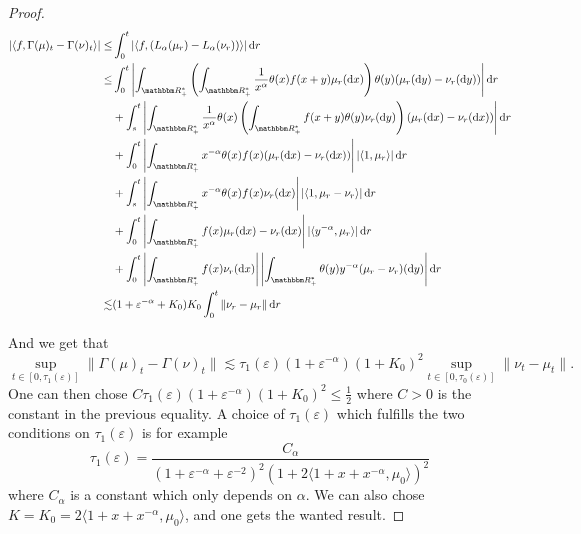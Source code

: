 \documentclass[a4paper,11pt, reqno]{amsart}
\newcommand{\eps}{\varepsilon}
\newcommand{\dd}{\mathop{}\!\mathrm{d}}
\newcommand{\1}{\mathbbm{1}}
\theoremstyle{plain}
\theoremstyle{definition}
\begin{document}
\begin{proof}
  \begin{align*}
    | \langle f, \Gamma (\mu)_t - \Gamma (\nu)_t \rangle | \le &
    \int_0^t | \langle f, (L_{\alpha} (\mu_r) - L_{\alpha} (\nu_r)) \rangle |
    \dd r\\
    \le & \int_0^t \left| \int_{\RR^{\ast}_+} \left(
    \int_{\RR^{\ast}_+} \frac{1}{x^{\alpha}} \theta (x) f (x + y) \mu_r
    (\dd x) \right) \theta (y) (\mu_r (\dd y) - \nu_r (\dd y))
    \right| \dd r\\
    & + \int_s^t \left| \int_{\RR^{\ast}_+} \frac{1}{x^{\alpha}}
    \theta (x) \left( \int_{\RR^{\ast}_+} f (x + y) \theta (y) \nu_r
    (\dd y) \right) (\mu_r (\dd x) - \nu_r (\dd x)) \right| \dd
    r\\
    & + \int_0^t \left| \int_{\RR^{\ast}_+} x^{- \alpha} \theta (x) f
    (x) (\mu_r (\dd x) - \nu_r (\dd x)) \right| | \langle 1, \mu_r
    \rangle | \dd r\\
    & + \int_s^t \left| \int_{\RR^{\ast}_+} x^{- \alpha} \theta (x) f
    (x) \nu_r (\dd x) \right| | \langle 1, \mu_r - \nu_r \rangle | \dd
    r\\
    & + \int_0^t \left| \int_{\RR^{\ast}_+} f (x) \mu_r (\dd x) -
    \nu_r (\dd x) \right| | \langle y^{- \alpha}, \mu_r \rangle | \dd
    r\\
    & + \int_0^t \left| \int_{\RR^{\ast}_+} f (x) \nu_r (\dd x)
    \right| \left| \int_{\RR^{\ast}_+} \theta (y) y^{- \alpha} (\mu_r -
    \nu_r) (\dd y) \right| \dd r\\
    \lesssim & (1 + \eps^{- \alpha} + K_0) K_0 \int_0^t \| \nu_r -
    \mu_r \| \dd r
  \end{align*}
  
  And we get that
  \[ \underset{t \in [0, \tau_1 (\eps)]}{\sup} \| \Gamma (\mu)_t -
     \Gamma (\nu)_t \| \lesssim \tau_1 (\eps) (1 + \eps^{-
     \alpha}) (1 + K_0)^2 \underset{t \in [0, \tau_0 (\eps)]}{\sup} \|
     \nu_t - \mu_t \| . \]
  One can then chose $C \tau_1 (\eps) (1 + \eps^{- \alpha}) (1 +
  K_0)^2 \le \frac{1}{2}$ where $C > 0$ is the constant in the previous
  equality. A choice of $\tau_1 (\eps)$ which fulfills the two
  conditions on $\tau_1 (\eps)$ is for example
  \[ \tau_1 (\eps) = \frac{C_{\alpha}}{(1 + \eps^{- \alpha} +
     \eps^{- 2})^2 (1 + 2 \langle 1 + x + x^{- \alpha}, \mu_0
     \rangle)^2} \]
  where $C_{\alpha}$ is a constant which only depends on $\alpha$. We can also
  chose $K = K_0 =  2 \langle 1 + x + x^{- \alpha}, \mu_0 \rangle$, and one
  gets the wanted result.
\end{proof}
\end{document}
